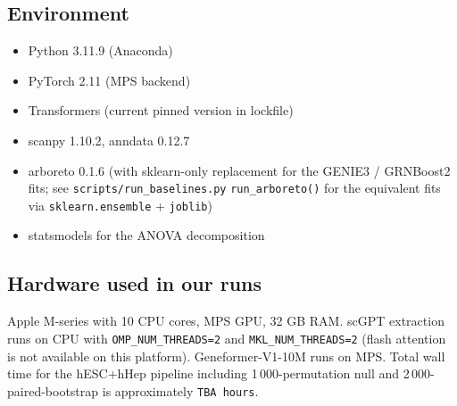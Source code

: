 \subsection{Environment}

\begin{itemize}
\item Python 3.11.9 (Anaconda)
\item PyTorch 2.11 (MPS backend)
\item Transformers (current pinned version in lockfile)
\item scanpy 1.10.2, anndata 0.12.7
\item arboreto 0.1.6 (with sklearn-only replacement for the
GENIE3 / GRNBoost2 fits; see \texttt{scripts/run\_baselines.py}
\texttt{run\_arboreto()} for the equivalent fits via
\texttt{sklearn.ensemble} + \texttt{joblib})
\item statsmodels for the ANOVA decomposition
\end{itemize}

\subsection{Hardware used in our runs}

Apple M-series with 10 CPU cores, MPS GPU, 32 GB RAM. scGPT extraction
runs on CPU with \texttt{OMP\_NUM\_THREADS=2} and
\texttt{MKL\_NUM\_THREADS=2} (flash attention is not available on this
platform). Geneformer-V1-10M runs on MPS. Total wall time for the
hESC+hHep pipeline including 1\,000-permutation null and
2\,000-paired-bootstrap is approximately \texttt{TBA hours}.

